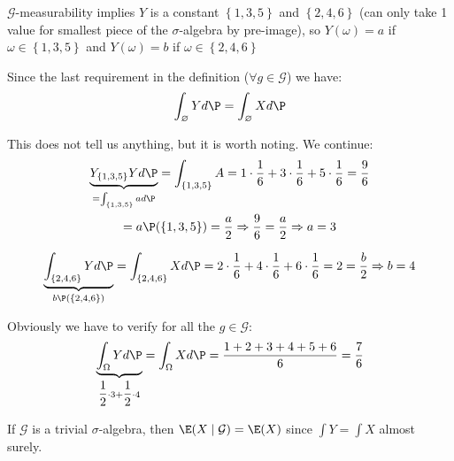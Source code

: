 \noindent $\mathcal{G}$-measurability implies $Y$ is a constant $\left\{1,3,5\right\}$ and $\left\{2,4,6\right\}$ (can only take 1 value for smallest piece of the $\sigma$-algebra by pre-image), so $Y(\omega) = a$ if $\omega\in\left\{1,3,5\right\}$ and $Y(\omega) = b$ if $\omega \in \left\{2,4,6\right\}$\par
\noindent Since the last requirement in the definition ($\forall g\in\mathcal{G}$) we have:
\begin{equation*}
  \begin{gathered}
    \int_\varnothing Yd\P = \int_\varnothing Xd\P
  \end{gathered}
\end{equation*}\par
\noindent This does not tell us anything, but it is worth noting. We continue:
\begin{equation*}
  \begin{gathered}
    \underbrace{Y_{\left\{1,3,5\right\}} Yd\P}_{= \int_{\left\{1,3,5\right\}}ad\P}= \int_{\left\{1,3,5\right\}}A = 1\cdot\dfrac{1}{6}+3\cdot\dfrac{1}{6}+5\cdot\dfrac{1}{6} = \dfrac{9}{6}\\
     = a\P(\left\{1,3,5\right\}) = \dfrac{a}{2}\Rightarrow \dfrac{9}{6} = \dfrac{a}{2} \Rightarrow a = 3
  \end{gathered}
\end{equation*}
\par\bigskip
\begin{equation*}
  \begin{gathered}
    \underbrace{\int_{\left\{2,4,6\right\}} Yd\P}_{b\P(\left\{2,4,6\right\})}= \int_{\left\{2,4,6\right\}}Xd\P = 2\cdot\dfrac{1}{6}+4\cdot\dfrac{1}{6}+6\cdot\dfrac{1}{6} = 2 = \dfrac{b}{2}\Rightarrow b = 4
  \end{gathered}
\end{equation*}\par
\noindent Obviously we have to verify for all the $g\in\mathcal{G}$:
\begin{equation*}
  \begin{gathered}
    \underbrace{\int_\Omega Yd\P}_{\dfrac{1}{2}\cdot3+\dfrac{1}{2}\cdot4}= \int_\Omega Xd\P = \dfrac{1+2+3+4+5+6}{6} = \dfrac{7}{6}
  \end{gathered}
\end{equation*}
\par\bigskip
\noindent If $\mathcal{G}$ is a trivial $\sigma$-algebra, then $\E(X\mid\mathcal{G}) = \E(X)$ since $\int Y = \int X$ almost surely.
\par\bigskip
